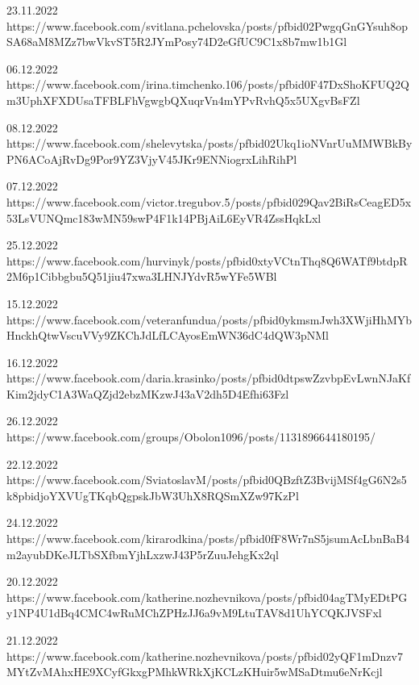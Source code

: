  
 
 
 
 


23.11.2022
https://www.facebook.com/svitlana.pchelovska/posts/pfbid02PwgqGnGYsuh8opSA68aM8MZz7bwVkvST5R2JYmPosy74D2eGfUC9C1x8b7mw1b1Gl

06.12.2022
https://www.facebook.com/irina.timchenko.106/posts/pfbid0F47DxShoKFUQ2Qm3UphXFXDUsaTFBLFhVgwgbQXuqrVn4mYPvRvhQ5x5UXgvBsFZl

08.12.2022
https://www.facebook.com/shelevytska/posts/pfbid02Ukq1ioNVnrUuMMWBkByPN6ACoAjRvDg9Por9YZ3VjyV45JKr9ENNiogrxLihRihPl

07.12.2022
https://www.facebook.com/victor.tregubov.5/posts/pfbid029Qav2BiRsCeagED5x53LsVUNQmc183wMN59swP4F1k14PBjAiL6EyVR4ZssHqkLxl

25.12.2022
https://www.facebook.com/hurvinyk/posts/pfbid0xtyVCtnThq8Q6WATf9btdpR2M6p1Cibbgbu5Q51jiu47xwa3LHNJYdvR5wYFe5WBl

15.12.2022
https://www.facebook.com/veteranfundua/posts/pfbid0ykmsmJwh3XWjiHhMYbHnckhQtwVscuVVy9ZKChJdLfLCAyosEmWN36dC4dQW3pNMl

16.12.2022
https://www.facebook.com/daria.krasinko/posts/pfbid0dtpswZzvbpEvLwnNJaKfKim2jdyC1A3WaQZjd2ebzMKzwJ43aV2dh5D4Efhi63Fzl

26.12.2022
https://www.facebook.com/groups/Obolon1096/posts/1131896644180195/

22.12.2022
https://www.facebook.com/SviatoslavM/posts/pfbid0QBzftZ3BvijMSf4gG6N2s5k8pbidjoYXVUgTKqbQgpskJbW3UhX8RQSmXZw97KzPl

24.12.2022
https://www.facebook.com/kirarodkina/posts/pfbid0fF8Wr7nS5jsumAcLbnBaB4m2ayubDKeJLTbSXfbmYjhLxzwJ43P5rZuuJehgKx2ql

20.12.2022
https://www.facebook.com/katherine.nozhevnikova/posts/pfbid04agTMyEDtPGy1NP4U1dBq4CMC4wRuMChZPHzJJ6a9vM9LtuTAV8d1UhYCQKJVSFxl

21.12.2022
https://www.facebook.com/katherine.nozhevnikova/posts/pfbid02yQF1mDnzv7MYtZvMAhxHE9XCyfGkxgPMhkWRkXjKCLzKHuir5wMSaDtmu6eNrKcjl

